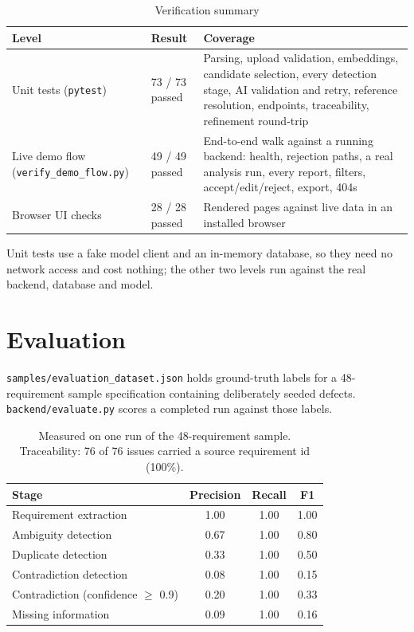 \begin{table}[h!]
\centering\small
\begin{tabular}{@{}p{4.4cm} p{1.9cm} p{9.0cm}@{}}
\toprule
\textbf{Level} & \textbf{Result} & \textbf{Coverage} \\
\midrule
Unit tests (\texttt{pytest}) & 73 / 73 passed & Parsing, upload validation, embeddings, candidate selection, every detection stage, AI validation and retry, reference resolution, endpoints, traceability, refinement round-trip \\
Live demo flow (\texttt{verify\_demo\_flow.py}) & 49 / 49 passed & End-to-end walk against a running backend: health, rejection paths, a real analysis run, every report, filters, accept/edit/reject, export, 404s \\
Browser UI checks & 28 / 28 passed & Rendered pages against live data in an installed browser \\
\bottomrule
\end{tabular}
\caption{Verification summary}
\end{table}

Unit tests use a fake model client and an in-memory database, so they need no
network access and cost nothing; the other two levels run against the real
backend, database and model.

\section{Evaluation}

\texttt{samples/evaluation\_dataset.json} holds ground-truth labels for a
48-requirement sample specification containing deliberately seeded defects.
\texttt{backend/evaluate.py} scores a completed run against those labels.

\begin{table}[h!]
\centering\small
\begin{tabular}{@{}l c c c@{}}
\toprule
\textbf{Stage} & \textbf{Precision} & \textbf{Recall} & \textbf{F1} \\
\midrule
Requirement extraction & 1.00 & 1.00 & 1.00 \\
Ambiguity detection & 0.67 & 1.00 & 0.80 \\
Duplicate detection & 0.33 & 1.00 & 0.50 \\
Contradiction detection & 0.08 & 1.00 & 0.15 \\
Contradiction (confidence $\geq$ 0.9) & 0.20 & 1.00 & 0.33 \\
Missing information & 0.09 & 1.00 & 0.16 \\
\bottomrule
\end{tabular}
\caption{Measured on one run of the 48-requirement sample. Traceability: 76 of 76 issues carried a source requirement id (100\%).}
\end{table}

